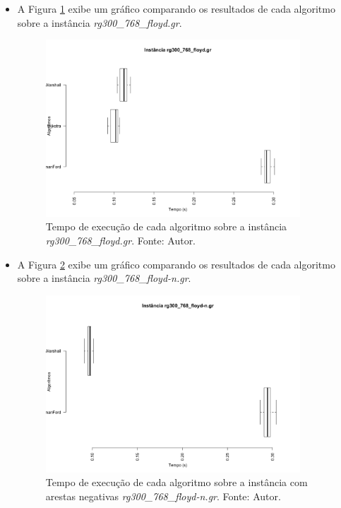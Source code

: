 \documentclass{beamer}
\begin{document}
	\begin{frame}{}
		\begin{itemize}
			\item A Figura \ref{fig:rg300_768_floyd} exibe um gráfico comparando os resultados de cada algoritmo sobre a instância \textit{ rg300\_768\_floyd.gr}.
			
			\begin{figure}[H]
				\centering
				\includegraphics[width=0.9\textwidth]{img/rg300_768_floyd.png}
				\caption{Tempo de execução de cada algoritmo sobre a instância \textit{rg300\_768\_floyd.gr}. Fonte: Autor.}
				\label{fig:rg300_768_floyd}
			\end{figure}
		\end{itemize}
	\end{frame}
	
	\begin{frame}{}
		\begin{itemize}
			\item A Figura \ref{fig:rg300_768_floyd_n} exibe um gráfico comparando os resultados de cada algoritmo sobre a instância \textit{ rg300\_768\_floyd-n.gr}.
			
			\begin{figure}[H]
				\centering
				\includegraphics[width=0.9\textwidth]{img/rg300_768_floyd-n_gr.png}
				\caption{Tempo de execução de cada algoritmo sobre a instância com arestas negativas \textit{rg300\_768\_floyd-n.gr}. Fonte: Autor.}
				\label{fig:rg300_768_floyd_n}
			\end{figure}
		\end{itemize}
	\end{frame}
	
\end{document}
